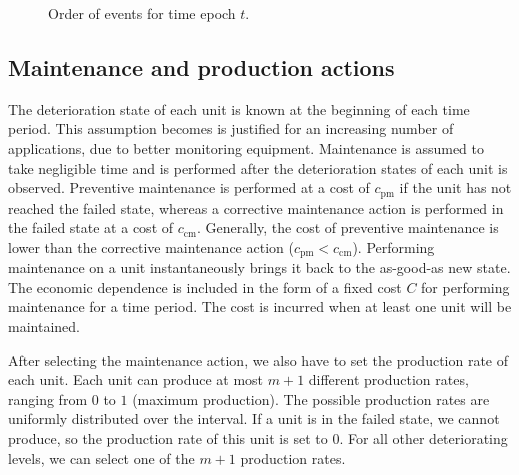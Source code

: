\documentclass[a4paper,12pt]{article}
\begin{document}
\begin{figure}[H]
	\centering
	\caption{Order of events for time epoch $t$.}
\end{figure}

\subsection{Maintenance and production actions}
The deterioration state of each unit is known at the beginning of each time period. This assumption becomes is justified for an increasing number of applications, due to better monitoring equipment. Maintenance is assumed to take negligible time and is performed after the deterioration states of each unit is observed. Preventive maintenance is performed at a cost of $c_\text{pm}$ if the unit has not reached the failed state, whereas a corrective maintenance action is performed in the failed state at a cost of $c_\text{cm}$. Generally, the cost of preventive maintenance is lower than the corrective maintenance action ($c_\text{pm} < c_\text{cm}$). Performing maintenance on a unit instantaneously brings it back to the as-good-as new state. The economic dependence is included in the form of a fixed cost $C$ for performing maintenance for a time period. The cost is incurred when at least one unit will be maintained.

After selecting the maintenance action, we also have to set the production rate of each unit. Each unit can produce at most $m+1$ different production rates, ranging from $0$ to $1$ (maximum production). The possible production rates are uniformly distributed over the interval. If a unit is in the failed state, we cannot produce, so the production rate of this unit is set to $0$. For all other deteriorating levels, we can select one of the $m+1$ production rates.
\end{document}
